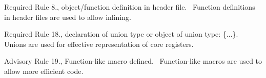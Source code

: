 \begin{DoxyItemize}
\item Required Rule 8., object/\+function definition in header file.~\newline
 Function definitions in header files are used to allow \textquotesingle{}inlining\textquotesingle{}.\end{DoxyItemize}
\begin{DoxyItemize}
\item Required Rule 18., declaration of union type or object of union type:\+ \textquotesingle{}\{...\}\textquotesingle{}.~\newline
 Unions are used for effective representation of core registers.\end{DoxyItemize}
\begin{DoxyItemize}
\item Advisory Rule 19., Function-\/like macro defined.~\newline
 Function-\/like macros are used to allow more efficient code. \end{DoxyItemize}
